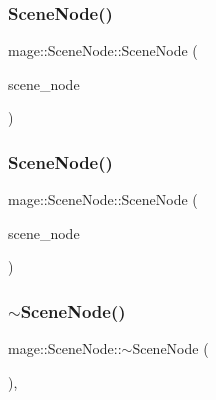\subsubsection{\texorpdfstring{Scene\+Node()}{SceneNode()}\hspace{0.1cm}{\footnotesize\ttfamily [2/3]}}
{\footnotesize\ttfamily mage\+::\+Scene\+Node\+::\+Scene\+Node (\begin{DoxyParamCaption}\item[{const \hyperlink{classmage_1_1_scene_node}{Scene\+Node} \&}]{scene\+\_\+node }\end{DoxyParamCaption})\hspace{0.3cm}{\ttfamily [default]}}

\hypertarget{classmage_1_1_scene_node_acbf94ceadac62f2ccde13d70ce9298d7}{}\label{classmage_1_1_scene_node_acbf94ceadac62f2ccde13d70ce9298d7} 
\subsubsection{\texorpdfstring{Scene\+Node()}{SceneNode()}\hspace{0.1cm}{\footnotesize\ttfamily [3/3]}}
{\footnotesize\ttfamily mage\+::\+Scene\+Node\+::\+Scene\+Node (\begin{DoxyParamCaption}\item[{\hyperlink{classmage_1_1_scene_node}{Scene\+Node} \&\&}]{scene\+\_\+node }\end{DoxyParamCaption})\hspace{0.3cm}{\ttfamily [default]}}

\hypertarget{classmage_1_1_scene_node_a6705beea9c535de3d495762ed06e74dd}{}\label{classmage_1_1_scene_node_a6705beea9c535de3d495762ed06e74dd} 
\subsubsection{\texorpdfstring{$\sim$\+Scene\+Node()}{~SceneNode()}}
{\footnotesize\ttfamily mage\+::\+Scene\+Node\+::$\sim$\+Scene\+Node (\begin{DoxyParamCaption}{ }\end{DoxyParamCaption})\hspace{0.3cm}{\ttfamily [virtual]}, {\ttfamily [default]}}



